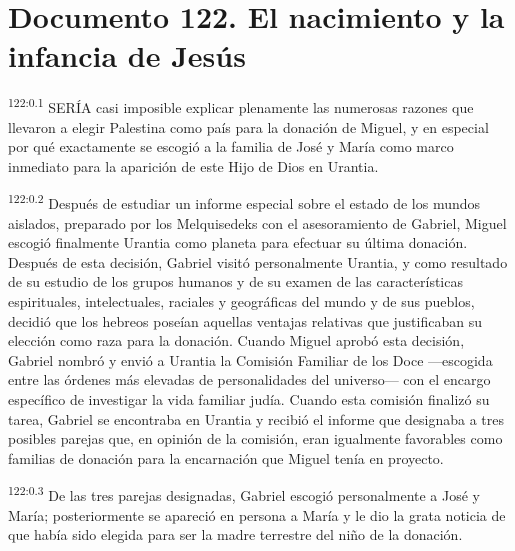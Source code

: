 \chapter{Documento 122. El nacimiento y la infancia de Jesús}
\par
\textsuperscript{122:0.1} SERÍA casi imposible explicar plenamente las numerosas razones que llevaron a elegir Palestina como país para la donación de Miguel, y en especial por qué exactamente se escogió a la familia de José y María como marco inmediato para la aparición de este Hijo de Dios en Urantia.

\par
\textsuperscript{122:0.2} Después de estudiar un informe especial sobre el estado de los mundos aislados, preparado por los Melquisedeks con el asesoramiento de Gabriel, Miguel escogió finalmente Urantia como planeta para efectuar su última donación. Después de esta decisión, Gabriel visitó personalmente Urantia, y como resultado de su estudio de los grupos humanos y de su examen de las características espirituales, intelectuales, raciales y geográficas del mundo y de sus pueblos, decidió que los hebreos poseían aquellas ventajas relativas que justificaban su elección como raza para la donación. Cuando Miguel aprobó esta decisión, Gabriel nombró y envió a Urantia la Comisión Familiar de los Doce ---escogida entre las órdenes más elevadas de personalidades del universo--- con el encargo específico de investigar la vida familiar judía. Cuando esta comisión finalizó su tarea, Gabriel se encontraba en Urantia y recibió el informe que designaba a tres posibles parejas que, en opinión de la comisión, eran igualmente favorables como familias de donación para la encarnación que Miguel tenía en proyecto.

\par
\textsuperscript{122:0.3} De las tres parejas designadas, Gabriel escogió personalmente a José y María; posteriormente se apareció en persona a María y le dio la grata noticia de que había sido elegida para ser la madre terrestre del niño de la donación.

